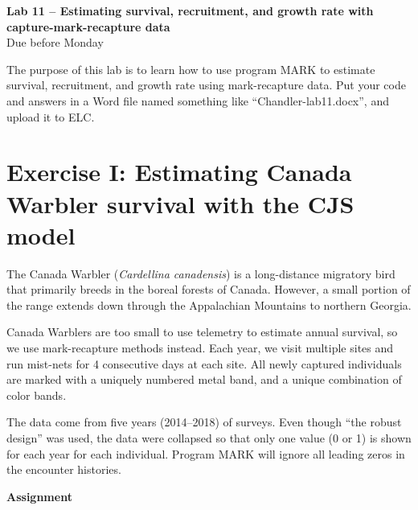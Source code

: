 \documentclass[12pt]{article}\usepackage[]{graphicx}\usepackage[]{color}
\begin{document}
{
  \Large
  \centering
  {\bf Lab 11 -- Estimating survival, recruitment, and growth rate
    with capture-mark-recapture data} \\
  Due before Monday \\
}

\vspace{10pt}

The purpose of this lab is to learn how to use program MARK to
estimate survival, recruitment, and growth rate using mark-recapture
data. Put your code and answers in a Word file named something like
``Chandler-lab11.docx'', and upload it to ELC.



\section*{\large Exercise I: Estimating Canada Warbler survival with the CJS model}



The Canada Warbler ({\it Cardellina canadensis}) is a long-distance
migratory bird that primarily breeds in the boreal forests of
Canada. However, a small portion of the range extends down through the
Appalachian Mountains to northern Georgia.

Canada Warblers are too small to use telemetry to estimate annual
survival, so we use mark-recapture methods instead. Each year, we
visit multiple sites and run mist-nets for 4 consecutive days at each
site. All newly captured individuals are marked with a uniquely
numbered metal band, and a unique combination of color bands.

The data come from five years (2014--2018) of surveys. Even though
``the robust design'' was used, the data were collapsed so that only
one value (0 or 1) is shown for each year for each individual. Program
MARK will ignore all leading zeros in the encounter histories.

{\bf Assignment}
\end{document}
